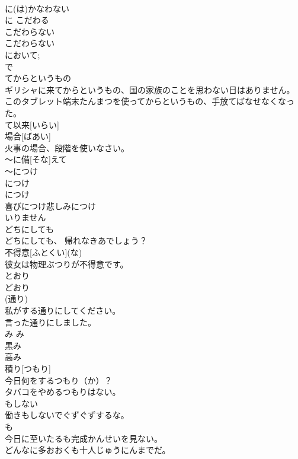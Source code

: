 \documentclass[8pt]{extreport}
\begin{document}
\begin{CJK}{UTF8}{min}
\\	に(は)かなわない	
\\	に  こだわる 
\\	こだわらない	
\\	こだわらない 
\\	において; 
\\	で 
\\	てからというもの	
\\	ギリシャに来てからというもの、国の家族のことを思わない日はありません。
\\	このタブレット端末たんまつを使ってからというもの、手放てばなせなくなった。
\\	て以来[いらい]	
\\	場合[ばあい]	
\\	火事の場合、段階を使いなさい。
\\	～に備[そな]えて	
\\	～につけ	
\\	につけ
\\	につけ	
\\	喜びにつけ悲しみにつけ 
\\	いりません	
\\	どちにしても	
\\	どちにしても、 帰れなきあでしょう？
\\	不得意[ふとくい](な)	
\\	彼女は物理ぶつりが不得意です。
\\	とおり  
\\	どおり
\\	(通り)	
\\	私がする通りにしてください。 
\\	言った通りにしました。 
\\	み	み 
\\	黒み 
\\	高み 
\\	積り[つもり]	
\\	今日何をするつもり（か）？ 
\\	タバコをやめるつもりはない。
\\	もしない	
\\	働きもしないでぐずぐずするな。 
\\	も
\\	今日に至いたるも完成かんせいを見ない。
\\	どんなに多おおくも十人じゅうにんまでだ。
\end{CJK}
\end{document}
